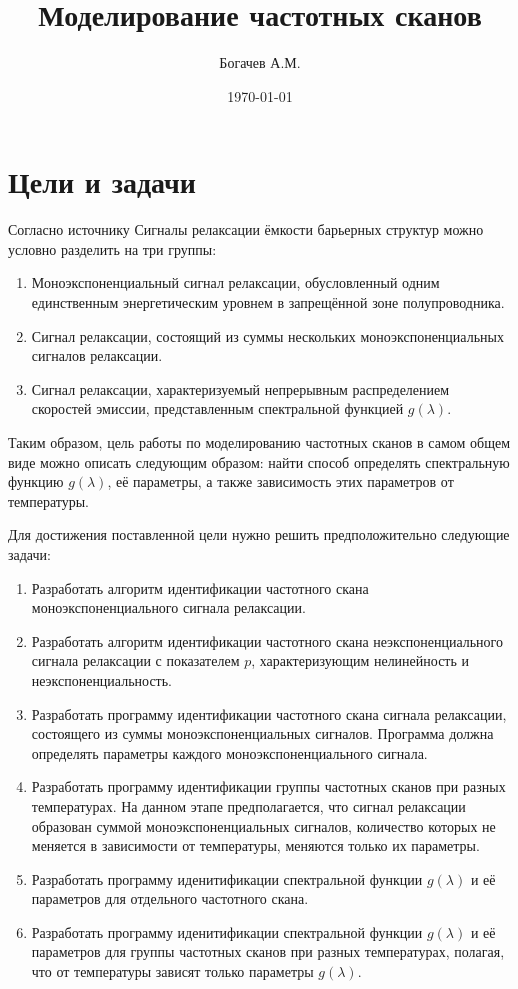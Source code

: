 \documentclass{report}
\title{Моделирование частотных сканов}
\author{Богачев А.М.}
\date{\today}
\begin{document}
    \maketitle


    \chapter{Цели и задачи}

    Согласно источнику \cite{istratov_exp_analysis} Сигналы релаксации ёмкости 
    барьерных структур можно условно разделить на три группы:
    \begin{enumerate}
        \item Моноэкспоненциальный сигнал релаксации, обусловленный одним единственным 
        энергетическим уровнем в запрещённой зоне полупроводника.
        \item Сигнал релаксации, состоящий из суммы нескольких моноэкспоненциальных 
        сигналов релаксации.
        \item Сигнал релаксации, характеризуемый непрерывным распределением скоростей 
        эмиссии, представленным спектральной функцией $g(\lambda)$.
    \end{enumerate}

    Таким образом, цель работы по моделированию частотных сканов в самом общем виде 
    можно описать следующим образом: найти способ определять спектральную функцию 
    $g(\lambda)$, её параметры, а также зависимость этих параметров от температуры.

    Для достижения поставленной цели нужно решить предположительно следующие задачи:
    \begin{enumerate}
        \item Разработать алгоритм идентификации частотного скана 
        моноэкспоненциального сигнала релаксации.
        \item Разработать алгоритм идентификации частотного скана 
        неэкспоненциального сигнала релаксации с показателем $p$, 
        характеризующим нелинейность и неэкспоненциальность.
        \item Разработать программу идентификации частотного 
        скана сигнала релаксации, состоящего из суммы моноэкспоненциальных 
        сигналов. Программа должна определять параметры каждого 
        моноэкспоненциального сигнала.
        \item Разработать программу идентификации группы частотных сканов 
        при разных температурах. На данном этапе предполагается, что сигнал 
        релаксации образован суммой моноэкспоненциальных сигналов, 
        количество которых не меняется в зависимости от температуры, 
        меняются только их параметры.
        \item Разработать программу иденитификации спектральной 
        функции $g(\lambda)$ и её параметров для отдельного 
        частотного скана.
        \item Разработать программу иденитификации спектральной 
        функции $g(\lambda)$ и её параметров для группы частотных сканов при 
        разных температурах, полагая, что от температуры зависят только 
        параметры $g(\lambda)$.
    \end{enumerate}
\end{document}
